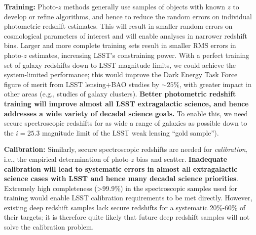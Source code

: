 
{\bf Training:} Photo-$z$ methods generally use samples of objects with known $z$ to develop or
refine algorithms, and hence to reduce the random errors on individual photometric redshift
estimates. This will result in smaller random errors on cosmological parameters of interest and
will enable analyses in narrower redshift bins.  Larger and more complete training sets result in smaller
RMS errors in photo-$z$ estimates, increasing LSST's constraining power.
With a perfect training set of galaxy redshifts down to LSST magnitude limits, we could achieve the system-limited performance; this would improve the Dark Energy Task Force figure of merit from LSST lensing+BAO studies by $\sim25$\%, with greater impact in other areas (e.g., studies of galaxy clusters).  {\bf Better photometric redshift training will improve almost all LSST extragalactic science, and hence addresses a wide variety of decadal science goals.}  To enable this, we need secure spectroscopic redshifts for as wide a range of galaxies as possible down to the $i=25.3$ magnitude limit of the LSST weak lensing ``gold sample'').


{\bf Calibration:} Similarly, secure spectroscopic redshifts are needed for {\em calibration}, i.e., the
empirical determination of photo-$z$ bias and scatter.  {\bf Inadequate calibration will lead to
  systematic errors in almost all extragalactic science cases with LSST and hence many decadal science priorities}.
Extremely high completeness (>99.9\%) in the spectroscopic samples used for training would enable
LSST calibration requirements to be met directly. However, existing deep redshift samples lack secure redshifts for a systematic 20\%-60\% of their targets; it is therefore quite likely that future deep redshift samples will not solve the calibration problem.

